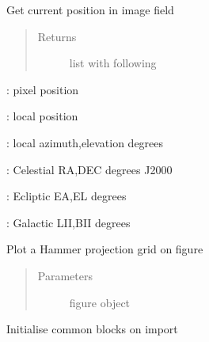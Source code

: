 \documentclass[letterpaper,10pt,english]{sphinxmanual}
\begin{document}
\begin{fulllineitems}
\label{\detokenize{images_functions:images.getpos}}
Get current position in image field
\begin{quote}\begin{description}
\item[{Returns}] \leavevmode
list with following

\end{description}\end{quote}

\begin{DUlineblock}{0em}
\item[] :     pixel position
\item[] :     local position
\item[] :     local azimuth,elevation degrees
\item[] :     Celestial RA,DEC degrees J2000
\item[] :     Ecliptic EA,EL degrees
\item[] :     Galactic LII,BII degrees
\end{DUlineblock}

\end{fulllineitems}


\begin{fulllineitems}
\label{\detokenize{images_functions:images.hamgrid}}
Plot a Hammer projection grid on figure
\begin{quote}\begin{description}
\item[{Parameters}] \leavevmode
{} \textendash{} figure object

\end{description}\end{quote}

\end{fulllineitems}


\begin{fulllineitems}
\label{\detokenize{images_functions:images.init}}
Initialise common blocks on import

\end{fulllineitems}
\end{document}
